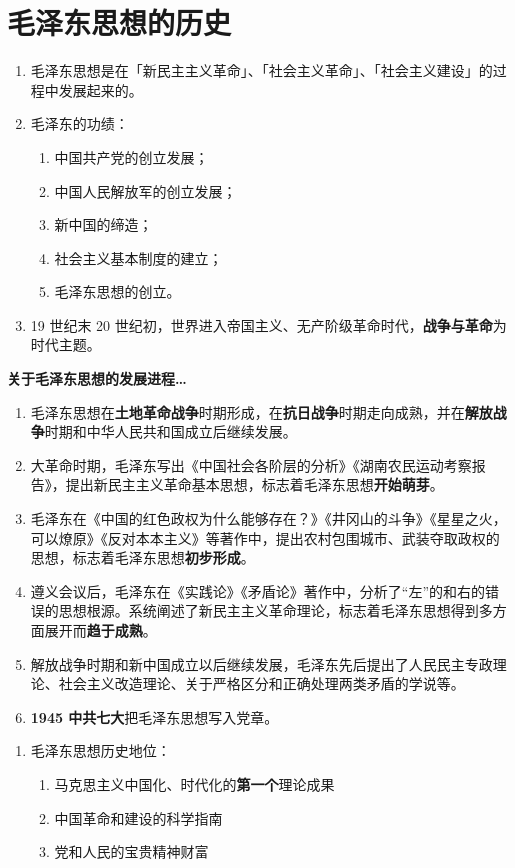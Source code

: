 \documentclass[UTF8]{ctexart}
\newcommand\Emph[2]{\colorbox{c#1-light}{\textcolor{c#1-emph}{\textbf{#2}}}}
\begin{document}
\section{毛泽东思想的历史}\label{sec:1}
\begin{enumerate}[start=1]
  \item 毛泽东思想是在「新民主主义革命」、「社会主义革命」、「社会主义建设」的过程中发展起来的。
  \item 毛泽东的功绩：
  \begin{enumerate}[label={\roman{enumii})}]
    \item 中国共产党的创立发展；
    \item 中国人民解放军的创立发展；
    \item 新中国的缔造；
    \item 社会主义基本制度的建立；
    \item 毛泽东思想的创立。
  \end{enumerate}
  \item 19 世纪末 20 世纪初，世界进入帝国主义、无产阶级革命时代，\Emph{1}{战争与革命}为时代主题。
\end{enumerate}

\begin{mybox}{1}
\textbf{关于毛泽东思想的发展进程…}
\begin{enumerate}
  \item 毛泽东思想在\Emph{1}{土地革命战争}时期形成，在\Emph{1}{抗日战争}时期走向成熟，并在\Emph{1}{解放战争}时期和中华人民共和国成立后继续发展。
  \item 大革命时期，毛泽东写出《中国社会各阶层的分析》《湖南农民运动考察报告》，提出新民主主义革命基本思想，标志着毛泽东思想\Emph{1}{开始萌芽}。
  \item 毛泽东在《中国的红色政权为什么能够存在？》《井冈山的斗争》《星星之火，可以燎原》《反对本本主义》等著作中，提出农村包围城市、武装夺取政权的思想，标志着毛泽东思想\Emph{1}{初步形成}。
  \item 遵义会议后，毛泽东在《实践论》《矛盾论》著作中，分析了“左”的和右的错误的思想根源。系统阐述了新民主主义革命理论，标志着毛泽东思想得到多方面展开而\Emph{1}{趋于成熟}。
  \item 解放战争时期和新中国成立以后继续发展，毛泽东先后提出了人民民主专政理论、社会主义改造理论、关于严格区分和正确处理两类矛盾的学说等。
  \item \Emph{1}{1945 中共七大}把毛泽东思想写入党章。
\end{enumerate}
\end{mybox}

\begin{enumerate}[start=10]
  \item 毛泽东思想历史地位：
  \begin{enumerate}[label={\roman{enumii})}]
    \item 马克思主义中国化、时代化的\Emph{1}{第一个}理论成果
    \item 中国革命和建设的科学指南
    \item 党和人民的宝贵精神财富
  \end{enumerate}
\end{enumerate}
\end{document}
